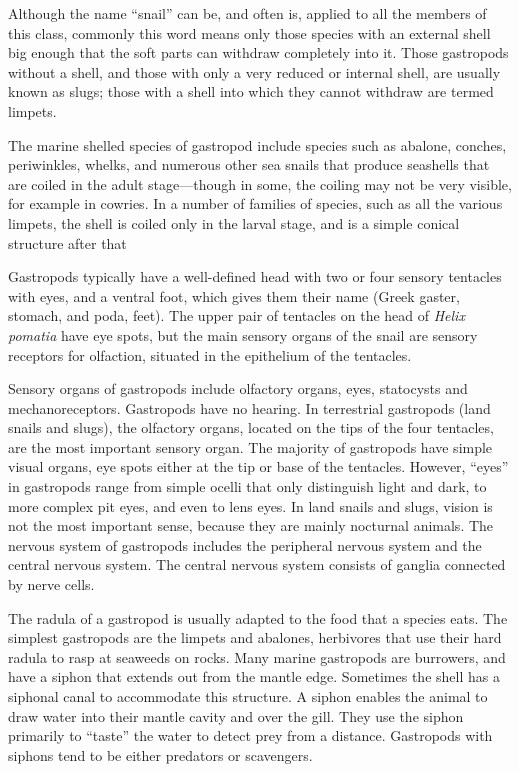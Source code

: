 Although the name ``snail'' can be, and often is, applied to all the
members of this class, commonly this word means only those species with
an external shell big enough that the soft parts can withdraw completely
into it. Those gastropods without a shell, and those with only a very
reduced or internal shell, are usually known as slugs; those with a
shell into which they cannot withdraw are termed limpets.

The marine shelled species of gastropod include species such as abalone,
conches, periwinkles, whelks, and numerous other sea snails that produce
seashells that are coiled in the adult stage---though in some, the
coiling may not be very visible, for example in cowries. In a number of
families of species, such as all the various limpets, the shell is
coiled only in the larval stage, and is a simple conical structure after
that

Gastropods typically have a well-defined head with two or four sensory
tentacles with eyes, and a ventral foot, which gives them their name
(Greek gaster, stomach, and poda, feet). The upper pair of tentacles on
the head of \emph{Helix pomatia} have eye spots, but the main sensory organs of
the snail are sensory receptors for olfaction, situated in the
epithelium of the tentacles.

Sensory organs of gastropods include olfactory organs, eyes, statocysts
and mechanoreceptors. Gastropods have no hearing. In terrestrial
gastropods (land snails and slugs), the olfactory organs, located on the
tips of the four tentacles, are the most important sensory organ. The
majority of gastropods have simple visual organs, eye spots either at
the tip or base of the tentacles. However, ``eyes'' in gastropods range
from simple ocelli that only distinguish light and dark, to more complex
pit eyes, and even to lens eyes. In land snails and slugs, vision is not
the most important sense, because they are mainly nocturnal animals. The
nervous system of gastropods includes the peripheral nervous system and
the central nervous system. The central nervous system consists of
ganglia connected by nerve cells.

The radula of a gastropod is usually adapted to the food that a species
eats. The simplest gastropods are the limpets and abalones, herbivores
that use their hard radula to rasp at seaweeds on rocks. Many marine
gastropods are burrowers, and have a siphon that extends out from the
mantle edge. Sometimes the shell has a siphonal canal to accommodate
this structure. A siphon enables the animal to draw water into their
mantle cavity and over the gill. They use the siphon primarily to
``taste'' the water to detect prey from a distance. Gastropods with
siphons tend to be either predators or scavengers.

